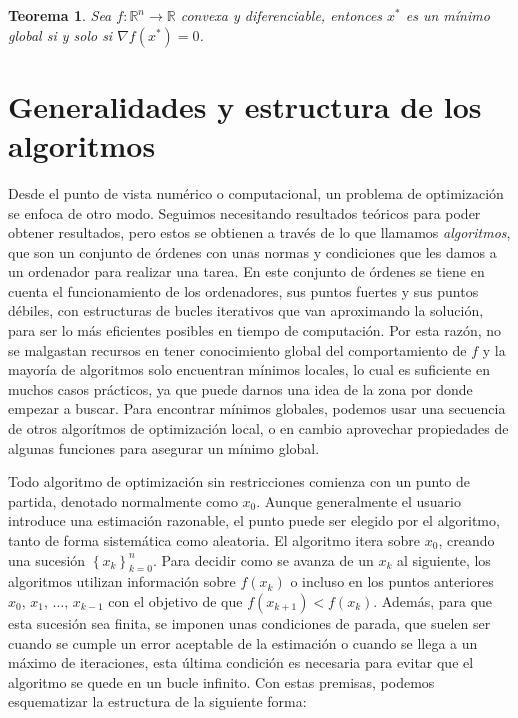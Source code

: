 \documentclass[11pt,a4paper]{book}
\newtheorem{theorem}{Teorema}[chapter]
\theoremstyle{definition}
\theoremstyle{remark}
\newcommand{\sucesionxk}{\left\{x_k\right\}}
\begin{document}
\begin{theorem} \label{th:convx}
	Sea $f: \mathbb{R}^n \rightarrow \mathbb{R}$ convexa y diferenciable, entonces $x^*$ es un
	mínimo global si y solo si $\nabla f(x^*) = 0$.
\end{theorem}


\section{Generalidades y estructura de los algoritmos}

Desde el punto de vista numérico o computacional, un problema de optimización se enfoca de otro
modo. Seguimos necesitando resultados teóricos para poder obtener resultados, pero estos se obtienen
a través de lo que llamamos \textit{algoritmos}, que son un conjunto de órdenes con unas normas y
condiciones que les damos a un ordenador para realizar una tarea. En este conjunto de órdenes
se tiene en cuenta el funcionamiento de los ordenadores, sus puntos fuertes y sus puntos débiles, con
estructuras de bucles iterativos que van aproximando la solución, para ser lo más eficientes posibles en tiempo de computación. Por esta razón, no se malgastan recursos en tener conocimiento global del comportamiento de $f$ y la mayoría de algoritmos solo encuentran mínimos locales, lo cual es suficiente en muchos casos prácticos, ya que puede darnos una idea de la zona por donde empezar a buscar. Para encontrar mínimos globales, podemos usar una secuencia de otros algorítmos de optimización local, o en cambio aprovechar propiedades de algunas funciones para asegurar un mínimo global.

Todo algoritmo de optimización sin restricciones comienza con un punto de partida, denotado
normalmente como $x_{0}$. Aunque generalmente el usuario introduce una estimación razonable,
el punto puede ser elegido por el algoritmo, tanto de forma sistemática como aleatoria.
El algoritmo itera sobre $x_{0}$, creando una sucesión $\sucesionxk_{k=0}^n$. Para decidir
como se avanza de un $x_k$ al siguiente, los algoritmos utilizan información sobre $f(x_k)$ o
incluso en los puntos anteriores $x_0,\, x_1,\, \ldots,\,x_{k-1}$ con el objetivo de que
$f(x_{k+1})<f(x_{k})$. Además, para que esta sucesión sea finita, se imponen unas condiciones
de parada, que suelen ser cuando se cumple un error aceptable de la estimación o cuando se
llega a un máximo de iteraciones, esta última condición es necesaria para evitar que el algoritmo se quede en un bucle infinito. Con estas premisas, podemos esquematizar la estructura de la siguiente forma:
\end{document}
